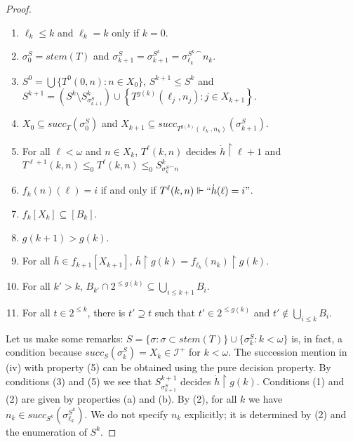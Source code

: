 \documentclass[10pt,a4paper]{amsart}
\newcommand{\id}{\mathcal{I}}
\begin{document}
\begin{proof}
\begin{enumerate}
    \item $\ell_k\leq k$ and $\ell_k=k$ only if $k=0$.
    \item $\sigma^S_0=stem(T)$ and $\sigma^S_{k+1}=\sigma^{S^k}_{k+1}={\sigma^{S^k}_{\ell_k}}^\frown n_k$.
    \item $S^0=\bigcup\{T^{0}(0,n):n\in X_0\}$, $S^{k+1}\leq S^{k}$ and  \\$S^{k+1}=\left(S^k\setminus S^k_{\sigma^S_{k+1}}\right)\cup \left\{T^{g(k)}(\ell_j,n_j):j\in X_{k+1}\right\}$.
    \item $X_0\subseteq succ_T(\sigma_0^S)$ and $X_{k+1}\subseteq succ_{T^{g(k)}(\ell_k,n_k)}(\sigma^S_{k+1})$.
    \item For all $\ell<\omega$ and $n\in X_k$, $T^{\ell}(k,n)$ decides $\dot h \upharpoonright \ell+1$ and
    \\$T^{\ell+1}(k,n)\leq_0 T^\ell(k,n)\leq_0 S^k_{{\sigma_k^S}^\frown n}$ 
    \item $f_k(n)(\ell)=i$ if and only if $T^\ell(k,n)\Vdash``\dot h(\ell)=i"$.
    \item $ f_k[X_k]\subseteq [B_k]$.
    \item $g(k+1)>g(k)$.
    \item For all $\bar h\in f_{k+1}[X_{k+1}]$, $\bar h\upharpoonright g(k)=f_{\ell_k}(n_k)\upharpoonright g(k)$.
    \item For all $k'>k, \,B_{k'}\cap 2^{\leq g(k)}\subseteq \bigcup_{i\leq k+1} B_i$.
    \item For all $t\in 2^{\leq k}$, there is $t'\supseteq t$ such that $t'\in 2^{\leq g(k)}$ and $ t'\notin \bigcup_{i\leq k}B_i$.
\end{enumerate}

Let us make some remarks: $S=\{\sigma: \sigma\subset  stem(T)\}\cup \{\sigma^S_{k}:k<\omega\}$ is, in fact, a condition because $succ_S(\sigma^S_k)=X_k\in\id^+$ for $k<\omega$. The succession mention in (iv) with property (5) can be obtained using the pure decision property. By conditions (3) and (5) we see that $S^{k+1}_{\sigma^{S}_{k+1}}$ decides $\dot h\upharpoonright g(k)$. Conditions (1) and (2) are given by properties (a) and (b). By (2), for all $k$ we have $n_k\in succ_{S^k}(\sigma^{S^k}_{\ell_k})$. We do not specify $n_k$ explicitly; it is determined by (2) and the enumeration of $S^k$.





\end{proof}
\end{document}
